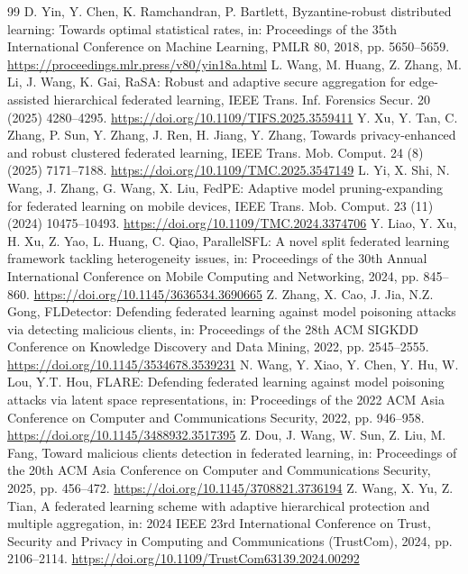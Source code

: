 \documentclass[final,5p,times,twocolumn]{elsarticle/elsarticle}
\begin{document}
\begin{thebibliography}{99}
     D. Yin, Y. Chen, K. Ramchandran, P. Bartlett, Byzantine-robust distributed learning: Towards optimal statistical rates, in: Proceedings of the 35th International Conference on Machine Learning, PMLR 80, 2018, pp. 5650--5659. \url{https://proceedings.mlr.press/v80/yin18a.html}
     L. Wang, M. Huang, Z. Zhang, M. Li, J. Wang, K. Gai, RaSA: Robust and adaptive secure aggregation for edge-assisted hierarchical federated learning, IEEE Trans. Inf. Forensics Secur. 20 (2025) 4280--4295. \url{https://doi.org/10.1109/TIFS.2025.3559411}
     Y. Xu, Y. Tan, C. Zhang, P. Sun, Y. Zhang, J. Ren, H. Jiang, Y. Zhang, Towards privacy-enhanced and robust clustered federated learning, IEEE Trans. Mob. Comput. 24 (8) (2025) 7171--7188. \url{https://doi.org/10.1109/TMC.2025.3547149}
     L. Yi, X. Shi, N. Wang, J. Zhang, G. Wang, X. Liu, FedPE: Adaptive model pruning-expanding for federated learning on mobile devices, IEEE Trans. Mob. Comput. 23 (11) (2024) 10475--10493. \url{https://doi.org/10.1109/TMC.2024.3374706}
     Y. Liao, Y. Xu, H. Xu, Z. Yao, L. Huang, C. Qiao, ParallelSFL: A novel split federated learning framework tackling heterogeneity issues, in: Proceedings of the 30th Annual International Conference on Mobile Computing and Networking, 2024, pp. 845--860. \url{https://doi.org/10.1145/3636534.3690665}
     Z. Zhang, X. Cao, J. Jia, N.Z. Gong, FLDetector: Defending federated learning against model poisoning attacks via detecting malicious clients, in: Proceedings of the 28th ACM SIGKDD Conference on Knowledge Discovery and Data Mining, 2022, pp. 2545--2555. \url{https://doi.org/10.1145/3534678.3539231}
     N. Wang, Y. Xiao, Y. Chen, Y. Hu, W. Lou, Y.T. Hou, FLARE: Defending federated learning against model poisoning attacks via latent space representations, in: Proceedings of the 2022 ACM Asia Conference on Computer and Communications Security, 2022, pp. 946--958. \url{https://doi.org/10.1145/3488932.3517395}
     Z. Dou, J. Wang, W. Sun, Z. Liu, M. Fang, Toward malicious clients detection in federated learning, in: Proceedings of the 20th ACM Asia Conference on Computer and Communications Security, 2025, pp. 456--472. \url{https://doi.org/10.1145/3708821.3736194}
     Z. Wang, X. Yu, Z. Tian, A federated learning scheme with adaptive hierarchical protection and multiple aggregation, in: 2024 IEEE 23rd International Conference on Trust, Security and Privacy in Computing and Communications (TrustCom), 2024, pp. 2106--2114. \url{https://doi.org/10.1109/TrustCom63139.2024.00292}

\end{thebibliography}
\end{document}
